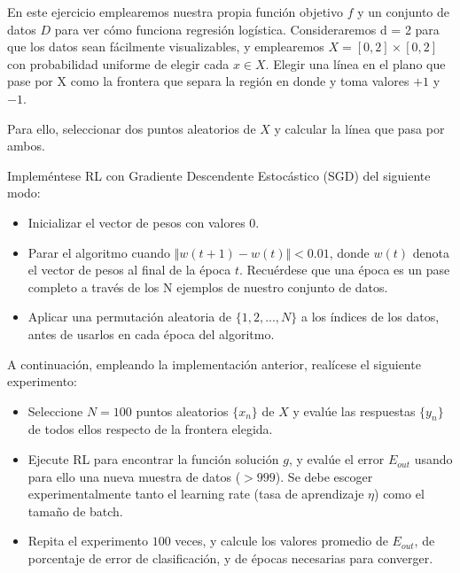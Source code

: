 En este ejercicio emplearemos nuestra propia función objetivo $f$ y un conjunto
de datos $D$ para ver cómo funciona regresión logística. Consideraremos d = 2
para que los datos sean fácilmente visualizables, y emplearemos 
$X = [0, 2] \times [0, 2]$ con probabilidad uniforme de elegir cada $x \in X$.
Elegir una línea en el plano que pase por X como la frontera que separa la
región en donde y toma valores $+1$ y $-1$.

Para ello, seleccionar dos puntos aleatorios de $X$ y calcular la línea que pasa
por ambos.

Impleméntese RL con Gradiente Descendente Estocástico (SGD) del siguiente modo:

\begin{itemize}
\item Inicializar el vector de pesos con valores 0.
\item Parar el algoritmo cuando $\Vert w(t+1) - w(t) \Vert < 0.01$, donde $w(t)$
denota el vector de pesos al final de la época $t$. Recuérdese que una época es
un pase completo a través de los N ejemplos de nuestro conjunto de datos. 
\item Aplicar una permutación aleatoria de $\{1, 2,..., N\}$ a los índices de
los datos, antes de usarlos en cada época del algoritmo. 
\end{itemize}

A continuación, empleando la implementación anterior, realícese el siguiente
experimento: 

\begin{itemize}
\item Seleccione $N = 100$ puntos aleatorios $\{x_n \}$  de $X$ y evalúe las
respuestas $\{y_n \}$ de todos ellos respecto de la frontera elegida.
\item Ejecute RL para encontrar la función solución $g$, y evalúe el error 
$E_{out}$ usando para ello una nueva muestra de datos ($> 999$). Se debe
escoger experimentalmente tanto el learning rate (tasa de aprendizaje $\eta$)
como el tamaño de batch. 
\item Repita el experimento $100$ veces, y calcule los valores promedio de 
$E_{out}$, de porcentaje de error de clasificación, y de épocas necesarias para
converger.
\end{itemize}